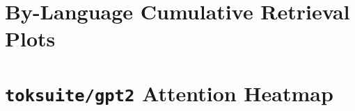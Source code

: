 \documentclass[11pt]{article}
\begin{document}


\appendix
\onecolumn

\section{By-Language Cumulative Retrieval Plots}\label{sec:appendix_layerwise}



\clearpage
\section{\texttt{toksuite/gpt2} Attention Heatmap}\label{sec:appendix_heatmap}

\end{document}
